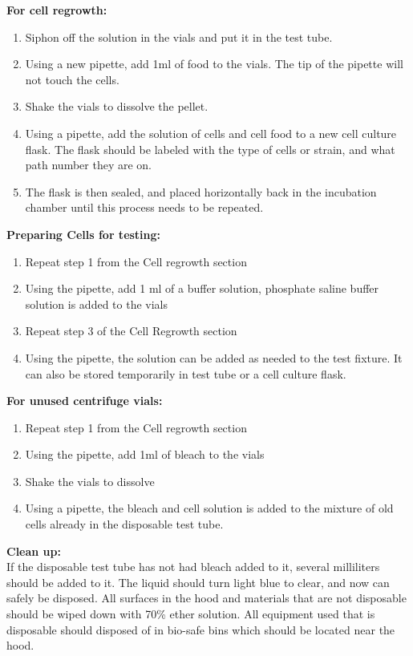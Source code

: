 \documentclass[journal]{IEEEtran}
\begin{document}
\textbf{For cell regrowth:}
\begin{enumerate}
\item Siphon off the solution in the vials and put it in the test tube. 
\item Using a new pipette, add 1ml of food to the vials. The tip of the pipette will not touch the cells.
\item Shake the vials to dissolve the pellet.
\item Using a pipette, add the solution of cells and cell food to a new cell culture flask. The flask should be labeled with the type of cells or strain, and what path number they are on.
\item The flask is then sealed, and placed horizontally back in the incubation chamber until this process needs to be repeated.
\end{enumerate}

\textbf{Preparing Cells for testing:}
\begin{enumerate}
\item Repeat step 1 from the Cell regrowth section
\item Using the pipette, add 1 ml of a buffer solution, phosphate saline buffer solution is added to the vials
\item Repeat step 3 of the Cell Regrowth section
\item Using the pipette, the solution can be added as needed to the test fixture. It can also be stored temporarily in test tube or a cell culture flask.
\end{enumerate}

\textbf{For unused centrifuge vials:}
\begin{enumerate}
\item Repeat step 1 from the Cell regrowth section
\item Using the pipette, add 1ml of bleach to the vials
\item Shake the vials to dissolve
\item Using a pipette, the bleach and cell solution is added to the mixture of old cells already in the disposable test tube. 
\end{enumerate}

\textbf{Clean up:} \\
If the disposable test tube has not had bleach added to it, several milliliters should be added to it. The liquid should turn light blue to clear, and now can safely be disposed. All surfaces in the hood and materials that are not disposable should be wiped down with 70\% ether solution. All equipment used that is disposable should disposed of in bio-safe bins which should be located near the hood. 
\end{document}
